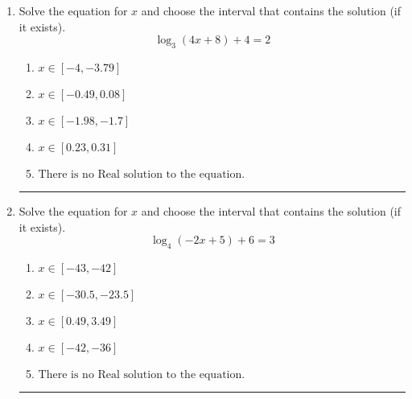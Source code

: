 \documentclass[14pt]{extbook}
\newcommand{\litem}[1]{\item#1\hspace*{-1cm}\rule{\textwidth}{0.4pt}}
\begin{document}
\begin{enumerate}
{\begin{enumerate}[label=\Alph*.]
\end{enumerate} }
\litem{
Solve the equation for $x$ and choose the interval that contains the solution (if it exists).\[ \log_{3}{(4x+8)}+4 = 2 \]\begin{enumerate}[label=\Alph*.]
\item \( x \in [-4, -3.79] \)
\item \( x \in [-0.49, 0.08] \)
\item \( x \in [-1.98, -1.7] \)
\item \( x \in [0.23, 0.31] \)
\item \( \text{There is no Real solution to the equation.} \)

\end{enumerate} }
\litem{
Solve the equation for $x$ and choose the interval that contains the solution (if it exists).\[ \log_{4}{(-2x+5)}+6 = 3 \]\begin{enumerate}[label=\Alph*.]
\item \( x \in [-43, -42] \)
\item \( x \in [-30.5, -23.5] \)
\item \( x \in [0.49, 3.49] \)
\item \( x \in [-42, -36] \)
\item \( \text{There is no Real solution to the equation.} \)

\end{enumerate} }
\end{enumerate}
\end{document}
